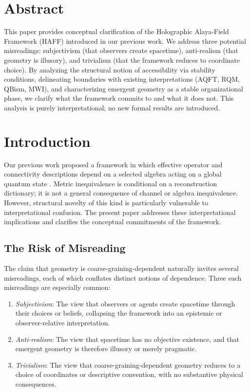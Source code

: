 \documentclass[12pt,a4paper,openany]{book}
\begin{document}
\bigskip

\section*{Abstract}
This paper provides conceptual clarification of the Holographic Alaya-Field Framework (HAFF) introduced in our previous work. 
We address three potential misreadings: subjectivism (that observers create spacetime), anti-realism (that geometry is illusory), and trivialism (that the framework reduces to coordinate choice). 
By analyzing the structural notion of accessibility via stability conditions, delineating boundaries with existing interpretations (AQFT, RQM, QBism, MWI), and characterizing emergent geometry as a stable organizational phase, we clarify what the framework commits to and what it does not. 
This analysis is purely interpretational; no new formal results are introduced.


\section{Introduction}
\label{H-B-sec:intro}

Our previous work proposed a framework in which effective operator and connectivity descriptions depend on a selected algebra acting on a global quantum state \cite{Liu2026}.  Metric inequivalence is conditional on a reconstruction dictionary; it is not a general consequence of channel or algebra inequivalence.
However, structural novelty of this kind is particularly vulnerable to interpretational confusion. 
The present paper addresses these interpretational implications and clarifies the conceptual commitments of the framework.

\subsection{The Risk of Misreading}

The claim that geometry is coarse-graining-dependent naturally invites several misreadings, each of which conflates distinct notions of dependence. 
Three such misreadings are especially common:

\begin{enumerate}
\item \emph{Subjectivism}: The view that observers or agents create spacetime through their choices or beliefs, collapsing the framework into an epistemic or observer-relative interpretation.
\item \emph{Anti-realism}: The view that spacetime has no objective existence, and that emergent geometry is therefore illusory or merely pragmatic.
\item \emph{Trivialism}: The view that coarse-graining-dependent geometry reduces to a choice of coordinates or descriptive convention, with no substantive physical consequences.
\end{enumerate}
\end{document}
